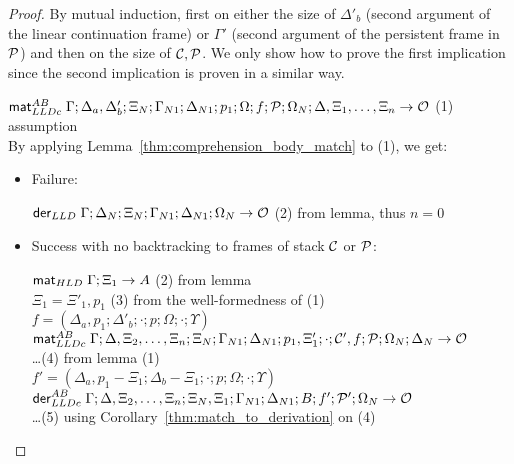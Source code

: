 \begin{proof}

By mutual induction, first on either the size of $\Delta'_b$ (second argument of
the linear continuation frame) or $\Gamma'$ (second argument of the
persistent frame in $\mathcal{P}$) and then on the size of $\mathcal{C},
\mathcal{P}$.  We only show how to prove the first implication since the
second implication is proven in a similar way.

$\mathsf{mat}_{LLDc}^{AB} \; \Gamma; \Delta_a, \Delta'_b; \Xi_N; \Gamma_{N1}; \Delta_{N1}; p_1;
\Omega; f; \mathcal{P}; \Omega_N; \Delta, \Xi_1, \dotsc, \Xi_n \rightarrow \mathcal{O}$ \hfill (1) assumption\\

By applying Lemma~\ref{thm:comprehension_body_match} to (1), we get:

\begin{itemize}[leftmargin=*]
   \item Failure:
   
   $\mathsf{der}_{LLD} \; \Gamma; \Delta_N; \Xi_N; \Gamma_{N1}; \Delta_{N1}; \Omega_N
   \rightarrow \mathcal{O}$ \hfill (2) from lemma, thus $n = 0$\\
   
   \item Success with no backtracking to frames of stack $\mathcal{C}$ or
   $\mathcal{P}$:
   
      $\mathsf{mat}_{HLD} \; \Gamma; \Xi_1 \rightarrow A$ \hfill (2) from lemma \\

      $\Xi_1 = \Xi'_1, p_1$ \hfill (3) from the well-formedness of (1) \\
      $f = (\Delta_a, p_1; \Delta'_b; \cdot; p; \Omega; \cdot; \Upsilon)$ \\

      $\mathsf{mat}_{LLDc}^{AB} \; \Gamma; \Delta, \Xi_2, \dotsc, \Xi_n; \Xi_N; \Gamma_{N1};
            \Delta_{N1}; p_1, \Xi'_1; \cdot; \mathcal{C'}, f; \mathcal{P}; \Omega_N; \Delta_N \rightarrow
            \mathcal{O}$ \\
      \dots \hfill (4) from lemma (1) \\

      $f' = (\Delta_a, p_1 - \Xi_1; \Delta_b - \Xi_1; \cdot; p; \Omega; \cdot;
            \Upsilon)$ \\

      $\mathsf{der}_{LLDc}^{AB} \; \Gamma; \Delta, \Xi_2, \dotsc, \Xi_n; \Xi_N, \Xi_1; \Gamma_{N1}; \Delta_{N1}; B; f';
      \mathcal{P'}; \Omega_N \rightarrow \mathcal{O}$ \\
      \dots \hfill (5) using Corollary~\ref{thm:match_to_derivation} on (4) \\


\end{itemize}
\end{proof}
